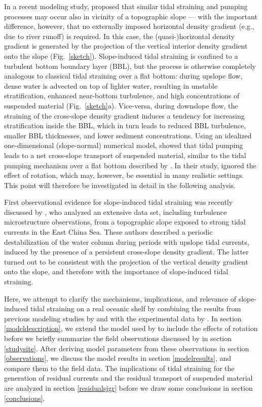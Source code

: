 In a recent modeling study, \cite{schulzumlauf2016} proposed that
similar tidal straining and pumping processes may occur also in
vicinity of a topographic slope --- with the important difference,
however, that no externally imposed horizontal density gradient (e.g.,
due to river runoff) is required. In this case, the (quasi-)horizontal
density gradient is generated by the projection of the vertical
interior density gradient onto the slope
(Fig.\ \ref{sketch}). Slope-induced tidal straining is confined to a
turbulent bottom boundary layer (BBL), but the process is otherwise
completely analogous to classical tidal straining over a flat bottom:
during upslope flow, dense water is advected on top of lighter water,
resulting in unstable stratification, enhanced near-bottom turbulence,
and high concentrations of suspended material
(Fig.\ \ref{sketch}a). Vice-versa, during downslope flow, the
straining of the cross-slope density gradient induces a tendency for
increasing stratification inside the BBL, which in turn leads to
reduced BBL turbulence, smaller BBL thicknesses, and lower sediment
concentrations. Using an idealized one-dimensional (slope-normal)
numerical model, \cite{schulzumlauf2016} showed that tidal pumping
leads to a net cross-slope transport of suspended material, similar to
the tidal pumping mechanism over a flat bottom described by
\cite{JayMusiak94a}. In their study, \cite{schulzumlauf2016} ignored
the effect of rotation, which may, however, be essential in many
realistic settings. This point will therefore be investigated in
detail in the following analysis.

First observational evidence for slope-induced tidal straining was
recently discussed by \cite{Endohetal2016a}, who analyzed an extensive
data set, including turbulence microstructure observations, from a
topographic slope exposed to strong tidal currents in the East China
Sea. These authors described a periodic destabilization of the water
column during periods with upslope tidal currents, induced by the
presence of a persistent cross-slope density gradient. The latter
turned out to be consistent with the projection of the vertical
density gradient onto the slope, and therefore with the importance of
slope-induced tidal straining.

Here, we attempt to clarify the mechanisms, implications, and
relevance of slope-induced tidal straining on a real oceanic shelf by
combining the results from previous modeling studies by
\cite{UmlaufBurchard2011a} and \cite{schulzumlauf2016} with the
experimental data by \cite{Endohetal2016a}.  In section
\ref{modeldescription}, we extend the model used by
\cite{schulzumlauf2016} to include the effects of rotation before we
briefly summarize the field observations discussed by
\cite{Endohetal2016a} in section \ref{studysite}. After deriving model
parameters from these observations in section \ref{observations}, we
discuss the model results in section \ref{modelresults}, and compare
them to the field data. The implications of tidal straining for the
generation of residual currents and the residual transport of
suspended material are analyzed in section \ref{residualsjgr} before we
draw some conclusions in section \ref{conclusions}.


